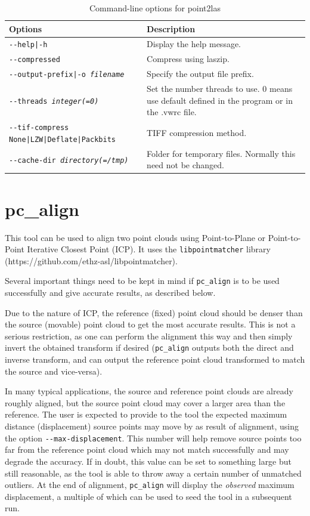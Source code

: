 \begin{longtable}{|l|p{10cm}|}
\caption{Command-line options for point2las}
\label{tbl:point2las}
\endfirsthead
\endhead
\endfoot
\endlastfoot
\hline
Options & Description \\ \hline \hline
\texttt{-\/-help|-h} & Display the help message.\\ \hline
\texttt{-\/-compressed} &
Compress using laszip. \\ \hline
\texttt{-\/-output-prefix|-o \textit{filename}} & Specify the output file prefix. \\ \hline
\texttt{-\/-threads \textit{integer(=0)}} & Set the number threads to use. 0 means use default defined in the program or in the .vwrc file.\\ \hline
\texttt{-\/-tif-compress None|LZW|Deflate|Packbits} & TIFF compression method.\\ \hline
\texttt{-\/-cache-dir \textit{directory(=/tmp)}} & Folder for temporary files. Normally this need not be changed.\\ \hline
\end{longtable}

\section{pc\_align}
\label{pcalign}

This tool can be used to align two point clouds using Point-to-Plane or
Point-to-Point Iterative Closest Point (ICP). It uses the
\texttt{libpointmatcher} library~\cite{Pomerleau12comp}
(https://github.com/ethz-asl/libpointmatcher).

Several important things need to be kept in mind if \texttt{pc\_align} is to be
used successfully and give accurate results, as described below.

Due to the nature of ICP, the reference (fixed) point cloud should be
denser than the source (movable) point cloud to get the most accurate
results. This is not a serious restriction, as one can perform the
alignment this way and then simply invert the obtained transform if
desired (\texttt{pc\_align} outputs both the direct and inverse
transform, and can output the reference point cloud transformed to match
the source and vice-versa).

In many typical applications, the source and reference point clouds are
already roughly aligned, but the source point cloud may cover a larger
area than the reference. The user is expected to provide to the tool the
expected maximum distance (displacement) source points may move by as
result of alignment, using the option
\texttt{-\/-max-displacement}. This number will help remove source
points too far from the reference point cloud which may not match
successfully and may degrade the accuracy. If in doubt, this value can be
set to something large but still reasonable, as the tool is able to
throw away a certain number of unmatched outliers. At the end of
alignment, \texttt{pc\_align} will display the {\it observed} maximum
displacement, a multiple of which can be used to seed the tool in a subsequent run.

